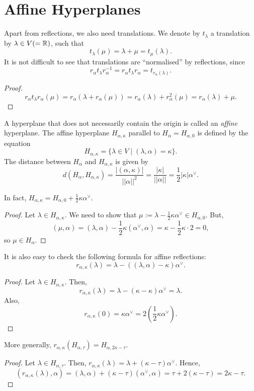 \section{Affine Hyperplanes}

Apart from reflections, we also need translations. We denote by $t_\lambda$
a translation by $\lambda \in V (= \mathbb{R})$, such that
\[
    t_\lambda(\mu) = \lambda + \mu = t_\mu(\lambda).
\]
It is not difficult to see that translations are ``normalised'' by reflections,
since
\[
    r_\alpha t_\lambda r_\alpha^{-1} = r_\alpha t_\lambda r_\alpha
    = t_{r_\alpha(\lambda)}.
\]
\begin{proof}
\[
    r_\alpha t_\lambda r_\alpha (\mu) = r_\alpha (\lambda + r_\alpha(\mu))
    = r_\alpha(\lambda) + r_\alpha^2(\mu) = r_\alpha(\lambda) + \mu.
\]
\end{proof}

A hyperplane that does not necessarily contain the origin is called an {\em
affine} hyperplane. The affine hyperplane $H_{\alpha, \kappa}$ parallel to
$H_\alpha = H_{\alpha, 0}$ is defined by the equation
\[
    H_{\alpha, \kappa} = \{\lambda \in V \mid (\lambda, \alpha) = \kappa\}.
\]
The distance between $H_{\alpha}$ and $H_{\alpha, \kappa}$ is given by
\[
    d(H_{\alpha}, H_{\alpha, \kappa}) = \frac{|(\alpha, \kappa)|}{||\alpha||^2}
    = \frac{|\kappa|}{||\alpha||} = \frac{1}{2} |\kappa| \alpha^\vee.
\]

In fact, $H_{\alpha, \kappa} = H_{\alpha, 0} + \frac{1}{2} \kappa \alpha^\vee$.
\begin{proof}
Let $\lambda \in H_{\alpha, \kappa}$. We need to show that $\mu := \lambda
- \frac{1}{2} \kappa \alpha^\vee \in H_{\alpha, 0}$. But,
\[
    (\mu, \alpha) = (\lambda, \alpha) - \frac{1}{2} \kappa (\alpha^\vee, \alpha)
    = \kappa - \frac{1}{2} \kappa \cdot 2 = 0,
\]
so $\mu \in H_{\alpha}$.
\end{proof}

It is also easy to check the following formula for affine reflections:
\[
    r_{\alpha, \kappa}(\lambda) = \lambda - ( (\lambda, \alpha) - \kappa) \alpha^\vee.
\]
\begin{proof}
Let $\lambda \in H_{\alpha, \kappa}$. Then,
\[
    r_{\alpha,\kappa}(\lambda) = \lambda - (\kappa - \kappa) \alpha^\vee = \lambda.
\]
Also,
\[
    r_{\alpha,\kappa}(0) = \kappa \alpha^\vee = 2 \left( \frac{1}{2}\kappa\alpha^\vee \right).
\]
\end{proof}

More generally, $r_{\alpha,\kappa}(H_{\alpha,\tau}) = H_{\alpha,2\kappa-\tau}$.
\begin{proof}
Let $\lambda \in H_{\alpha,\tau}$. Then, $r_{\alpha, \kappa}(\lambda)
= \lambda + (\kappa - \tau) \alpha^\vee$. Hence,
\[
    (r_{\alpha,\kappa}(\lambda), \alpha)
    = (\lambda, \alpha) + (\kappa - \tau) (\alpha^\vee, \alpha)
    = \tau + 2(\kappa - \tau) = 2\kappa - \tau.
\]
\end{proof}

